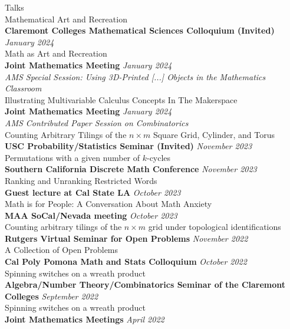 \documentclass{cv} %
\begin{document}
\begin{rSection}{Talks}
  \\ Mathematical Art and Recreation
  \\
  \textbf{Claremont Colleges Mathematical Sciences Colloquium (Invited)} \hfill \textit{January 2024}
  \\ Math as Art and Recreation
  \\
  \textbf{Joint Mathematics Meeting} \hfill \textit{January 2024}
  \\ \textit{AMS Special Session: Using 3D-Printed [...] Objects in the Mathematics Classroom}
  \\ Illustrating Multivariable Calculus Concepts In The Makerspace
  \\
  \textbf{Joint Mathematics Meeting} \hfill \textit{January 2024} \\
  \textit{AMS Contributed Paper Session on Combinatorics} \\
  Counting Arbitrary Tilings of the $n \times m$ Square Grid, Cylinder, and Torus
  \\
  \textbf{USC Probability/Statistics Seminar (Invited)} \hfill \textit{November 2023} \\
  Permutations with a given number of $k$-cycles
  \\
  \textbf{Southern California Discrete Math Conference} \hfill \textit{November 2023} \\
  Ranking and Unranking Restricted Words
  \\
  \textbf{Guest lecture at Cal State LA} \hfill \textit{October 2023}\\
  Math is for People: A Conversation About Math Anxiety
  \\
  \textbf{MAA SoCal/Nevada meeting} \hfill \textit{October 2023} \\
  Counting arbitrary tilings of the $n \times m$ grid under topological identifications
  \\
  \textbf{Rutgers Virtual Seminar for Open Problems} \hfill \textit{November 2022} \\
  A Collection of Open Problems
  \\
  \textbf{Cal Poly Pomona Math and Stats Colloquium} \hfill \textit{October 2022} \\
  Spinning switches on a wreath product
  \\
  \textbf{Algebra/Number Theory/Combinatorics Seminar of the Claremont Colleges} \hfill \textit{September 2022} \\
  Spinning switches on a wreath product
  \\
  \textbf{Joint Mathematics Meetings} \hfill \textit{April 2022} \\

\end{rSection}
\end{document}
